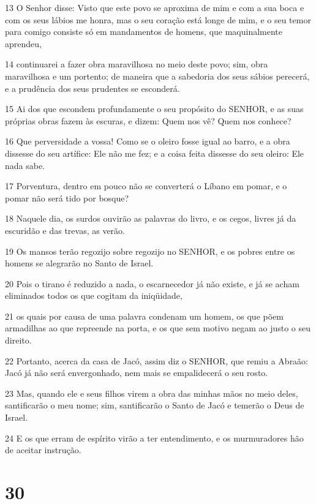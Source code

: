 \par 13 O Senhor disse: Visto que este povo se aproxima de mim e com a sua boca e com os seus lábios me honra, mas o seu coração está longe de mim, e o seu temor para comigo consiste só em mandamentos de homens, que maquinalmente aprendeu,
\par 14 continuarei a fazer obra maravilhosa no meio deste povo; sim, obra maravilhosa e um portento; de maneira que a sabedoria dos seus sábios perecerá, e a prudência dos seus prudentes se esconderá.
\par 15 Ai dos que escondem profundamente o seu propósito do SENHOR, e as suas próprias obras fazem às escuras, e dizem: Quem nos vê? Quem nos conhece?
\par 16 Que perversidade a vossa! Como se o oleiro fosse igual ao barro, e a obra dissesse do seu artífice: Ele não me fez; e a coisa feita dissesse do seu oleiro: Ele nada sabe.
\par 17 Porventura, dentro em pouco não se converterá o Líbano em pomar, e o pomar não será tido por bosque?
\par 18 Naquele dia, os surdos ouvirão as palavras do livro, e os cegos, livres já da escuridão e das trevas, as verão.
\par 19 Os mansos terão regozijo sobre regozijo no SENHOR, e os pobres entre os homens se alegrarão no Santo de Israel.
\par 20 Pois o tirano é reduzido a nada, o escarnecedor já não existe, e já se acham eliminados todos os que cogitam da iniqüidade,
\par 21 os quais por causa de uma palavra condenam um homem, os que põem armadilhas ao que repreende na porta, e os que sem motivo negam ao justo o seu direito.
\par 22 Portanto, acerca da casa de Jacó, assim diz o SENHOR, que remiu a Abraão: Jacó já não será envergonhado, nem mais se empalidecerá o seu rosto.
\par 23 Mas, quando ele e seus filhos virem a obra das minhas mãos no meio deles, santificarão o meu nome; sim, santificarão o Santo de Jacó e temerão o Deus de Israel.
\par 24 E os que erram de espírito virão a ter entendimento, e os murmuradores hão de aceitar instrução.

\chapter{30}

